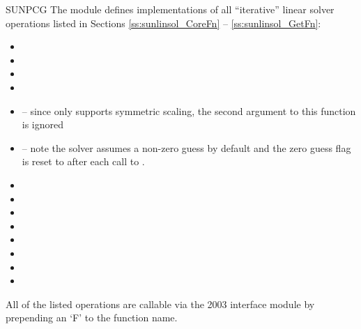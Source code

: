 {SUNPCG}
%
%
\noindent The {\sunlinsolpcg} module defines implementations of all
``iterative'' linear solver operations listed in Sections
\ref{ss:sunlinsol_CoreFn} -- \ref{ss:sunlinsol_GetFn}:
\begin{itemize}
\item {}
\item {}
\item {}
\item {}
\item {} -- since {\pcg} only
  supports symmetric scaling, the second {\nvector} argument to this
  function is ignored
\item {} -- note the solver assumes a non-zero
  guess by default and the zero guess flag is reset to  after each
  call to .
\item {}
\item {}
\item {}
\item {}
\item {}
\item {}
\item {}
\item {}
\end{itemize}
All of the listed operations are callable via the {\F} 2003 interface module
by prepending an `F' to the function name.

